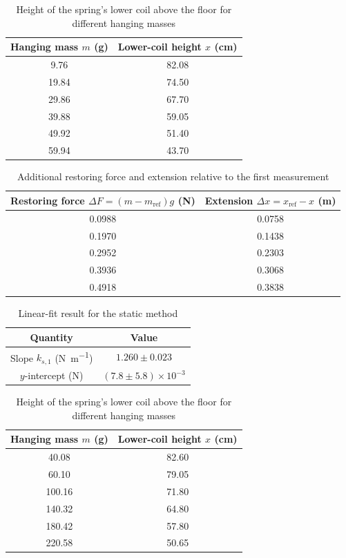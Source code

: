 \begin{table}[htb!]
\centering
\caption{Height of the spring's lower coil above the floor for different hanging masses}
\begin{tabular}{cc}
\toprule
Hanging mass $m$ (\unit{\g}) & Lower-coil height $x$ (\unit{\cm}) \\
\midrule
9.76 & 82.08 \\
19.84 & 74.50 \\
29.86 & 67.70 \\
39.88 & 59.05 \\
49.92 & 51.40 \\
59.94 & 43.70 \\
\bottomrule
\end{tabular}
\end{table}
\begin{table}[htb!]
\centering
\caption{Additional restoring force and extension relative to the first measurement}
\begin{tabular}{cc}
\toprule
Restoring force $\Delta F=(m-m_{\text{ref}})g$ (\unit{\N}) & Extension $\Delta x=x_{\text{ref}}-x$ (\unit{\m}) \\
\midrule
0.0988 & 0.0758 \\
0.1970 & 0.1438 \\
0.2952 & 0.2303 \\
0.3936 & 0.3068 \\
0.4918 & 0.3838 \\
\bottomrule
\end{tabular}
\end{table}
\begin{table}[htb!]
\centering
\caption{Linear-fit result for the static method}
\begin{tabular}{cc}
\toprule
Quantity & Value \\
\midrule
Slope $k_{s,1}$ (\unit{\N\per\m}) & $1.260 \pm 0.023$ \\
$y$-intercept (\unit{\N}) & $(7.8 \pm 5.8)\times 10^{-3}$ \\
\bottomrule
\end{tabular}
\end{table}
\begin{table}[htb!]
\centering
\caption{Height of the spring's lower coil above the floor for different hanging masses}
\begin{tabular}{cc}
\toprule
Hanging mass $m$ (\unit{\g}) & Lower-coil height $x$ (\unit{\cm}) \\
\midrule
40.08 & 82.60 \\
60.10 & 79.05 \\
100.16 & 71.80 \\
140.32 & 64.80 \\
180.42 & 57.80 \\
220.58 & 50.65 \\
\bottomrule
\end{tabular}
\end{table}
